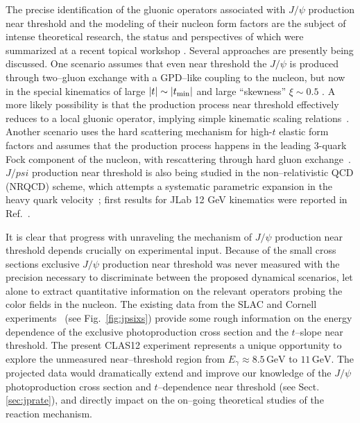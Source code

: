 The precise identification of the gluonic operators associated with
$J/\psi$ production near threshold and the modeling of their nucleon
form factors are the subject of intense theoretical research, the
status and perspectives of which were summarized at a recent topical
workshop \cite{temple}. Several approaches are presently being discussed. 
One scenario assumes that even near threshold the $J/\psi$ is produced 
through two--gluon exchange with a GPD--like coupling to 
the nucleon, but now in the special kinematics of large 
$|t| \sim |t_{\rm min}|$ and large ``skewness'' 
$\xi \sim 0.5$ \cite{frankfurt:2002ka}. A more likely possibility
is that the production process near threshold effectively reduces to 
a local gluonic operator, implying simple kinematic scaling 
relations~\cite{weiss:temple}. Another scenario uses the hard scattering 
mechanism for high-$t$ elastic form factors and assumes that the 
production process happens in the leading 3-quark 
Fock component of the nucleon, with rescattering through hard
gluon exchange~\cite{brodsky:2000zc}. $J/psi$ production near threshold 
is also being studied in the non--relativistic QCD (NRQCD) scheme,
which attempts a systematic parametric expansion in the heavy quark 
velocity~\cite{Butenschoen:2009zy,Butenschoen:2011yh}; first results 
for JLab 12 GeV kinematics were reported 
in Ref.~\cite{Butenschoen:temple}.

It is clear that progress with unraveling the mechanism of $J/\psi$ 
production near threshold depends crucially on experimental input.
Because of the small cross sections exclusive $J/\psi$ production 
near threshold was never measured with the precision necessary to 
discriminate between the proposed dynamical scenarios, let alone to 
extract quantitative information on the relevant operators probing 
the color fields in the nucleon. The existing data from the SLAC
and Cornell experiments~\cite{gittelman:1975ix,camerini:1975cy}
(see Fig.~\ref{fig:jpsixs}) provide some rough information on 
the energy dependence of the exclusive photoproduction cross section
and the $t$--slope near threshold. The present CLAS12 experiment
represents a unique opportunity to explore the unmeasured 
near--threshold region from $E_{\gamma} \approx 8.5 \, \textrm{GeV}$
to $11 \, \textrm{GeV}$. The projected data would dramatically
extend and improve our knowledge of the $J/\psi$ photoproduction
cross section and $t$--dependence near threshold (see Sect. \ref{sec:jprate}),
and directly impact on the on--going theoretical studies of the
reaction mechanism.


